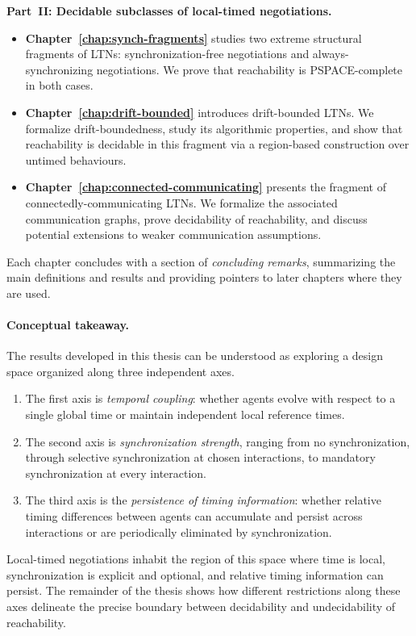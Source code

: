 \medskip
\noindent\textbf{Part~II: Decidable subclasses of local-timed negotiations.}

\begin{itemize}
  \item \textbf{Chapter~\ref{chap:synch-fragments}} studies two extreme structural fragments of LTNs: synchronization-free negotiations and always-synchronizing negotiations. We prove that reachability is PSPACE-complete in both cases.
  \item \textbf{Chapter~\ref{chap:drift-bounded}} introduces drift-bounded LTNs. We formalize drift-boundedness, study its algorithmic properties, and show that reachability is decidable in this fragment via a region-based construction over untimed behaviours.
  \item \textbf{Chapter~\ref{chap:connected-communicating}} presents the fragment of connectedly-communicating LTNs. We formalize the associated communication graphs, prove decidability of reachability, and discuss potential extensions to weaker communication assumptions.
\end{itemize}

\medskip
Each chapter concludes with a section of \emph{concluding remarks}, summarizing the main definitions and results and providing pointers to later chapters where they are used.

\paragraph{Conceptual takeaway.}
The results developed in this thesis can be understood as exploring a design space
organized along three independent axes. 

\begin{enumerate}
\item The first axis is \emph{temporal coupling}: whether agents evolve with respect to a single global time or maintain independent local reference times. 
\item The second axis is \emph{synchronization strength}, ranging from no synchronization, through selective synchronization at chosen interactions, to mandatory synchronization at every interaction. 
\item The third axis is the \emph{persistence of timing information}: whether relative timing differences between agents can accumulate and persist across interactions or are periodically eliminated by synchronization.
\end{enumerate}
Local-timed negotiations inhabit the region of this space where
time is local, synchronization is explicit and optional, and relative timing
information can persist. The remainder of the thesis shows how different restrictions
along these axes delineate the precise boundary between decidability and
undecidability of reachability.

